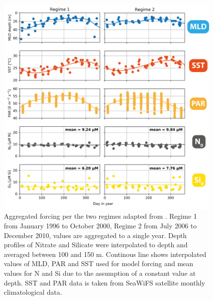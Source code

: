 \begin{figure}
\centering
\includegraphics[trim = 0mm 0mm 0mm 0mm, clip, width=1.\linewidth]{./Chp2-Pre/ForcingAsset411.png}
\caption[Scheme]{\small {Aggregated forcing per the two regimes adapted from \citet{Pinckney2015}. Regime 1 from January 1996 to October 2000, Regime 2 from July 2006 to December 2010, values are aggregated to a single year. Depth profiles of Nitrate and Silicate were interpolated to depth and averaged between 100 and 150 m. Continous line shows interpolated values of MLD, PAR and SST used for model forcing and mean values for N and Si due to the assumption of a constant value at depth. SST and PAR data is taken from SeaWiFS satellite monthly climatological data. }}
\label{ModelForcing}
\end{figure}

